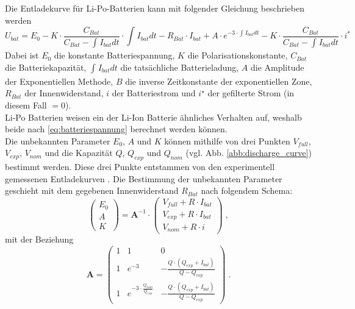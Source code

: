 Die Entladekurve für Li-Po-Batterien kann mit folgender Gleichung beschrieben werden
\begin{equation}
	U_{bat} = E_0-K\cdot\frac{C_{Bat}}{C_{Bat}-\int_{}^{} I_{bat} dt}\cdot\int_{}^{} I_{bat} dt - R_{Bat}\cdot I_{bat}+A\cdot e^{-3\cdot\int_{}^{} I_{bat} dt}-K\cdot\frac{C_{Bat}}{C_{Bat}-\int_{}^{} I_{bat} dt}\cdot i^* \label{eq:batteriespannung}
\end{equation}
Dabei ist \ensuremath{E_0} die konstante Batteriespannung, \ensuremath{K} die Polarisationskonstante, \ensuremath{C_{Bat}} die Batteriekapazität, \ensuremath{\int_{}^{} I_{bat} dt} die tatsächliche Batterieladung, \ensuremath{A} die Amplitude der Exponentiellen Methode, \ensuremath{B} die inverse Zeitkonstante der exponentiellen Zone, \ensuremath{R_{Bat}} der Innenwiderstand, \ensuremath{i} der Batteriestrom und \ensuremath{i^\star} der gefilterte Strom (in diesem Fall \(= 0\)). \\
Li-Po Batterien weisen ein der Li-Ion Batterie ähnliches Verhalten auf, weshalb beide nach \ref{eq:batteriespannung} berechnet werden können.\\
Die unbekannten Parameter \ensuremath{E_0}, \ensuremath{A} und \ensuremath{K} können mithilfe von drei Punkten \ensuremath{V_{full}}, \ensuremath{V_{exp}}, \ensuremath{V_{nom}} und die Kapazität \ensuremath{Q}, \ensuremath{Q_{exp}} und \ensuremath{Q_{nom}} (vgl. Abb. \ref{abb:discharge_curve}) bestimmt werden. Diese drei Punkte entstammen von den experimentell gemessenen Entladekurven \cite{elektromodellflug}.
Die Bestimmung der unbekannten Parameter geschieht mit dem gegebenen Innenwiderstand \ensuremath{R_{Bat}} nach folgendem Schema:
\begin{equation}
	\begin{pmatrix} E_0 \\ A \\ K \end{pmatrix} = \textbf{A}^{-1}\cdot \begin{pmatrix}
	V_{full}+R\cdot I_{bat} \\ V_{exp}+R\cdot I_{bat} \\ V_{nom}+R\cdot i \end{pmatrix}\; ,
\end{equation}
mit der Beziehung
\begin{equation}
	\textbf{A} = \begin{pmatrix}
	1 & 1 & 0 \\ 1 & e^{-3} & -\frac{Q\cdot (Q_{exp}+I_{bat})}{Q-Q_{exp}} \\ 1 & e^{-3\cdot\frac{Q_{nom}}{Q_{exp}}} & -\frac{Q\cdot (Q_{exp}+I_{bat})}{Q-Q_{exp}}
	\end{pmatrix}\; .
\end{equation}
